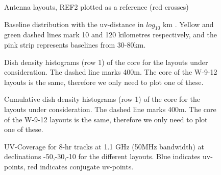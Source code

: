\documentclass[sfheadings,a4paper,times,9pt,floats,floatfix]{article}
\begin{document}
\begin{figure}[H]
 \tiny{}
 \caption{Antenna layouts, REF2 plotted as a reference (red crosses)}\label{fig:lay}
\end{figure}
\begin{figure}[H]
 \tiny{}
 \caption{Baseline distribution with the uv-distance in $log_{10}$ km . Yellow and green dashed lines mark 10 and 120
kilometres respectively, and the pink strip represents baselines from 30-80km.}\label{fig:hist}
\end{figure}
\begin{figure}[H]
 \centering
 
 \caption{Dish density histograms (row 1) of the core for the layouts under consideration. The dashed line marks 400m. The core of
the W-9-12 layouts is the same, therefore we only need to plot one of these.}
\end{figure}
\begin{figure}[H]
 \centering
 
 \caption{Cumulative dish density histograms (row 1) of the core for the layouts under consideration. The dashed line marks 400m.
The core of the W-9-12 layouts is the same, therefore we only need to plot one of these.}
\end{figure}
\begin{figure}[H]
 \tiny{}
 \caption{UV-Coverage for 8-hr tracks at 1.1 GHz (50MHz bandwidth) at declinations -50,-30,-10 for the different layouts. Blue
indicates uv-points, red indicates conjugate uv-points.}\label{fig:uvcov}
\end{figure}
\end{document}
